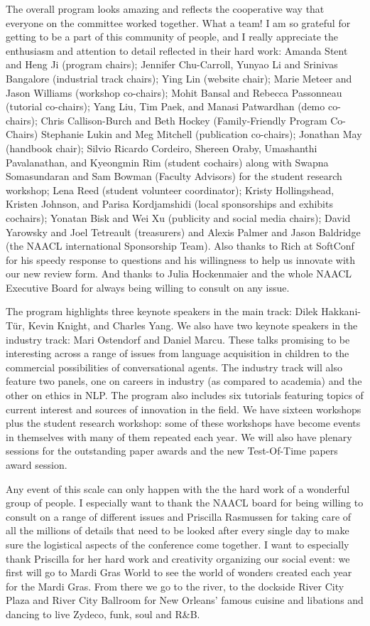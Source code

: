 The overall program looks amazing and reflects the cooperative way
that everyone on the committee worked together. What a team! I am so
grateful for getting to be a part of this community of people, and I
really appreciate the enthusiasm and attention to detail reflected in
their hard work: Amanda Stent and Heng Ji (program chairs); Jennifer
Chu-Carroll, Yunyao Li and Srinivas Bangalore (industrial track
chairs); Ying Lin (website chair); Marie Meteer and Jason Williams
(workshop co-chairs); Mohit Bansal and Rebecca Passonneau (tutorial
co-chairs); Yang Liu, Tim Paek, and Manasi Patwardhan (demo
co-chairs); Chris Callison-Burch and Beth Hockey (Family-Friendly
Program Co-Chairs) Stephanie Lukin and Meg Mitchell (publication
co-chairs); Jonathan May (handbook chair); Silvio Ricardo Cordeiro,
Shereen Oraby, Umashanthi Pavalanathan, and Kyeongmin Rim (student
cochairs) along with Swapna Somasundaran and Sam Bowman (Faculty
Advisors) for the student research workshop; Lena Reed (student
volunteer coordinator); Kristy Hollingshead, Kristen Johnson, and
Parisa Kordjamshidi (local sponsorships and exhibits cochairs);
Yonatan Bisk and Wei Xu (publicity and social media chairs); David
Yarowsky and Joel Tetreault (treasurers) and Alexis Palmer and Jason
Baldridge (the NAACL international Sponsorship Team). Also thanks to
Rich at SoftConf for his speedy response to questions and his
willingness to help us innovate with our new review form. And thanks
to Julia Hockenmaier and the whole NAACL Executive Board for always
being willing to consult on any issue.

The program highlights three keynote speakers in the main track: Dilek
Hakkani-T\"{u}r, Kevin Knight, and Charles Yang. We also have two keynote
speakers in the industry track: Mari Ostendorf and Daniel Marcu. These
talks promising to be interesting across a range of issues from
language acquisition in children to the commercial possibilities
of conversational agents. The industry track will also feature
two panels, one on careers in industry (as compared to academia)
and the other on ethics in
NLP. The program also includes six tutorials featuring topics
of current interest and sources of innovation in the field.
We have sixteen workshops
plus the student research workshop: some of these workshops have become
events in themselves with many of them repeated each year.
We will also have plenary sessions for the outstanding paper awards and the
new Test-Of-Time papers award session. 

Any event of this scale can only happen with the the hard work of a
wonderful group of people. I especially want to thank the NAACL board
for being willing to consult on a range of different issues and
Priscilla Rasmussen for taking care of all the millions of details
that need to be looked after every single day to make sure the
logistical aspects of the conference come together.  I want to
especially thank Priscilla for her hard work and creativity organizing
our social event: we first will go to Mardi Gras World to see the
world of wonders created each year for the Mardi Gras. From there we
go to the river, to the dockside River City Plaza and River City
Ballroom for New Orleans' famous cuisine and libations and dancing to
live Zydeco, funk, soul and R\&B.

